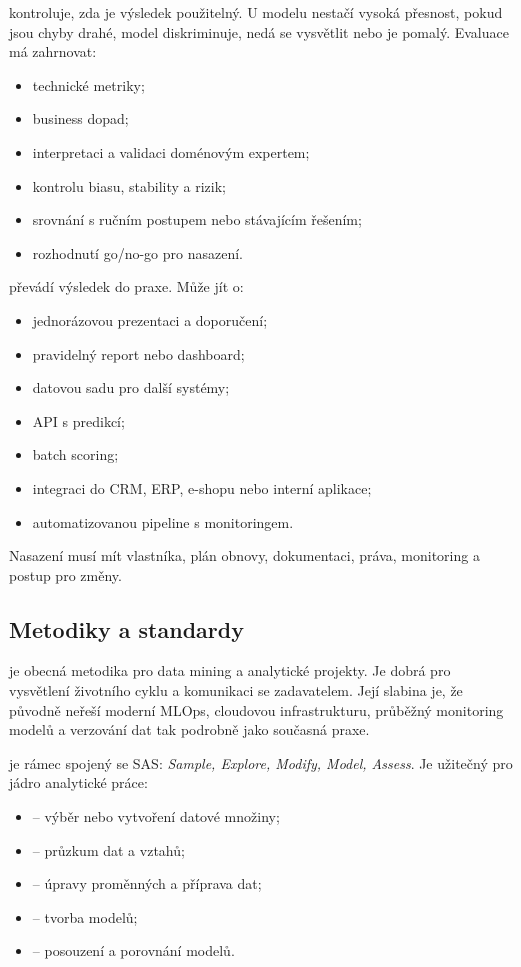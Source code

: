  kontroluje, zda je výsledek použitelný. U modelu nestačí vysoká přesnost, pokud jsou chyby drahé, model diskriminuje, nedá se vysvětlit nebo je pomalý. Evaluace má zahrnovat:
\begin{itemize}
  \item technické metriky;
  \item business dopad;
  \item interpretaci a validaci doménovým expertem;
  \item kontrolu biasu, stability a rizik;
  \item srovnání s ručním postupem nebo stávajícím řešením;
  \item rozhodnutí go/no-go pro nasazení.
\end{itemize}

 převádí výsledek do praxe. Může jít o:
\begin{itemize}
  \item jednorázovou prezentaci a doporučení;
  \item pravidelný report nebo dashboard;
  \item datovou sadu pro další systémy;
  \item API s predikcí;
  \item batch scoring;
  \item integraci do CRM, ERP, e-shopu nebo interní aplikace;
  \item automatizovanou pipeline s monitoringem.
\end{itemize}

Nasazení musí mít vlastníka, plán obnovy, dokumentaci, práva, monitoring a postup pro změny.

\subsection{Metodiky a standardy}
 je obecná metodika pro data mining a analytické projekty. Je dobrá pro vysvětlení životního cyklu a komunikaci se zadavatelem. Její slabina je, že původně neřeší moderní MLOps, cloudovou infrastrukturu, průběžný monitoring modelů a verzování dat tak podrobně jako současná praxe.

 je rámec spojený se SAS: \textit{Sample, Explore, Modify, Model, Assess}. Je užitečný pro jádro analytické práce:
\begin{itemize}
  \item {} -- výběr nebo vytvoření datové množiny;
  \item {} -- průzkum dat a vztahů;
  \item {} -- úpravy proměnných a příprava dat;
  \item {} -- tvorba modelů;
  \item {} -- posouzení a porovnání modelů.
\end{itemize}

